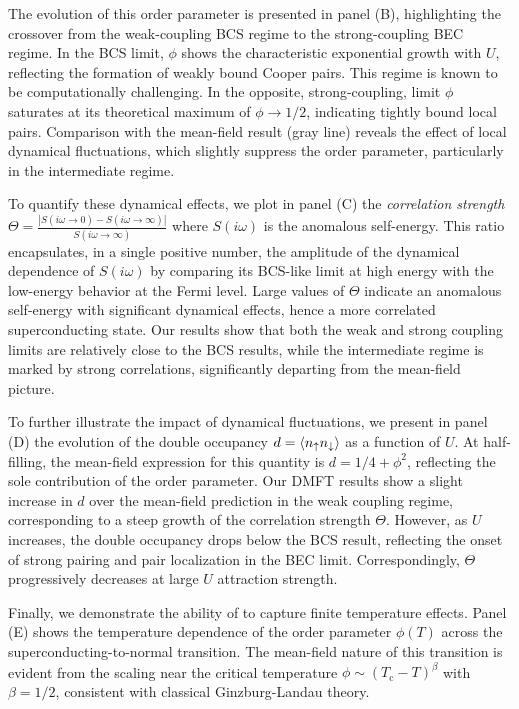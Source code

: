\documentclass[edipack_sp.tex]{subfiles}
\begin{document}
The evolution of this order parameter is presented in panel (B), 
highlighting the crossover from the weak-coupling BCS regime to the 
strong-coupling BEC regime. In the BCS limit, $\phi$ shows the 
characteristic exponential growth with $U$, reflecting the formation 
of weakly bound Cooper pairs. This regime is known to be 
computationally challenging. In the opposite, strong-coupling, limit 
$\phi$ saturates at its theoretical maximum of $\phi \rightarrow 1/2$, 
indicating tightly bound local pairs. Comparison with the mean-field result 
(gray line) reveals the effect of local dynamical fluctuations, which 
slightly suppress the order parameter, particularly in the intermediate 
regime.



To quantify these dynamical effects, we plot in panel (C) the 
\emph{correlation strength}
$\Theta=\frac{|S(i\omega\to 0)-S(i\omega\to\infty)|}{S(i\omega\to\infty)}$
where $S(i\omega)$ is the anomalous self-energy.
This ratio encapsulates, in a single positive number, %
the amplitude of the dynamical dependence of $S(i\omega)$ by comparing its 
BCS-like limit at high energy with the low-energy behavior at the Fermi level. 
Large values of $\Theta$ indicate an anomalous self-energy with 
significant dynamical effects, hence a more correlated superconducting state.
Our results show that both the weak 
and strong coupling limits are relatively close to the BCS results, 
while the intermediate regime is marked by strong 
correlations, significantly departing from the mean-field picture.

To further illustrate the impact of dynamical fluctuations, we 
present in panel (D) the evolution of the double occupancy 
$d = \langle n_\uparrow n_\downarrow \rangle$ as a function of $U$. At half-filling, 
the mean-field expression for this quantity is $d = 1/4 + \phi^2$, 
reflecting the sole contribution of the order parameter. Our DMFT 
results show a slight increase in $d$ over the mean-field prediction 
in the weak coupling regime, corresponding to a steep growth of
the correlation strength $\Theta$. 
However, as $U$ increases, the double occupancy drops below 
the BCS result, reflecting the onset of strong pairing and 
pair localization in the BEC limit. Correspondingly, $\Theta$ 
progressively decreases at large $U$ attraction strength.

Finally, we demonstrate the ability of \NAME to capture finite 
temperature effects. Panel (E) shows the temperature dependence of 
the order parameter $\phi(T)$ across the superconducting-to-normal 
transition. The mean-field nature of this transition is evident from 
the scaling near the critical temperature 
$\phi \sim (T_\mathrm{c} - T)^\beta$ with $\beta = 1/2$, consistent 
with classical Ginzburg-Landau theory.
\end{document}
